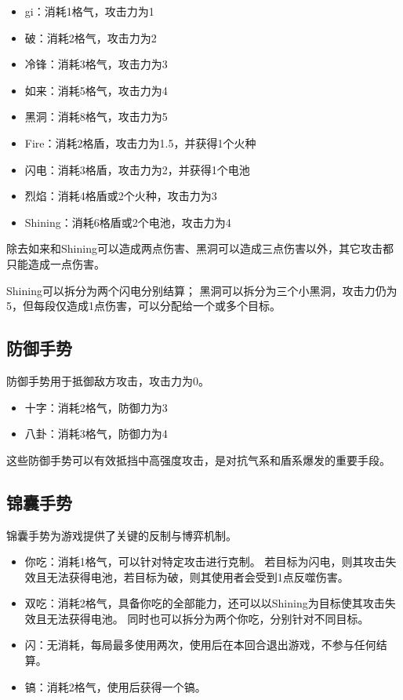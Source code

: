 \documentclass[12pt]{ctexart}
\begin{document}
\begin{itemize}
    \item gi：消耗1格气，攻击力为1
    \item 破：消耗2格气，攻击力为2
    \item 冷锋：消耗3格气，攻击力为3
    \item 如来：消耗5格气，攻击力为4
    \item 黑洞：消耗8格气，攻击力为5
    \item Fire：消耗2格盾，攻击力为1.5，并获得1个火种
    \item 闪电：消耗3格盾，攻击力为2，并获得1个电池
    \item 烈焰：消耗4格盾或2个火种，攻击力为3
    \item Shining：消耗6格盾或2个电池，攻击力为4
\end{itemize}

除去如来和Shining可以造成两点伤害、黑洞可以造成三点伤害以外，其它攻击都只能造成一点伤害。

Shining可以拆分为两个闪电分别结算；
黑洞可以拆分为三个小黑洞，攻击力仍为5，但每段仅造成1点伤害，可以分配给一个或多个目标。

\subsection{防御手势}

防御手势用于抵御敌方攻击，攻击力为0。

\begin{itemize}
    \item 十字：消耗2格气，防御力为3
    \item 八卦：消耗3格气，防御力为4
\end{itemize}

这些防御手势可以有效抵挡中高强度攻击，是对抗气系和盾系爆发的重要手段。

\subsection{锦囊手势}

锦囊手势为游戏提供了关键的反制与博弈机制。

\begin{itemize}
    \item 你吃：消耗1格气，可以针对特定攻击进行克制。
    若目标为闪电，则其攻击失效且无法获得电池，若目标为破，则其使用者会受到1点反噬伤害。
    \item 双吃：消耗2格气，具备你吃的全部能力，还可以以Shining为目标使其攻击失效且无法获得电池。
    同时也可以拆分为两个你吃，分别针对不同目标。
    \item 闪：无消耗，每局最多使用两次，使用后在本回合退出游戏，不参与任何结算。
    \item 镐：消耗2格气，使用后获得一个镐。
\end{itemize}
\end{document}
